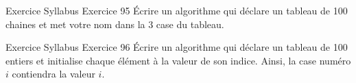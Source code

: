 
\begin{frame}{Exercice \theexercice}{Syllabus Exercice 95}
    Écrire un algorithme qui déclare un tableau de 100 chaines
    et met votre nom dans la 3\ieme{} case du tableau.
\end{frame}

\begin{frame}{Exercice \theexercice}{Syllabus Exercice 96}
    Écrire un algorithme qui déclare un tableau de 100 entiers
    et initialise chaque élément à la valeur de son indice.
    Ainsi, la case numéro $i$ contiendra la valeur $i$.
\end{frame}


